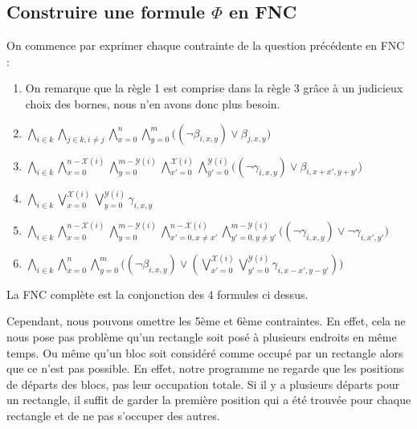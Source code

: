 \documentclass[a4paper]{article}
\begin{document}
\subsection{Construire une formule $\Phi$ en FNC}
On commence par exprimer chaque contrainte de la question précédente en FNC :
\begin{enumerate}
  \item On remarque que la règle 1 est comprise dans la règle 3 grâce à un judicieux choix des bornes, nous n'en avons donc plus besoin.

  \item $
  \bigwedge_{i \in k} \bigwedge_{j \in k, i \neq j} \bigwedge_{x=0}^{n} \bigwedge_{y=0}^{m}
  \Big( (\lnot \beta_{i, x, y}) \lor \beta_{j, x, y} \Big)
  $

  \item $
  \bigwedge_{i \in k}
  \bigwedge_{x=0}^{n - \mathcal{X}(i)} \bigwedge_{y=0}^{m - \mathcal{Y}(i)}
  \bigwedge_{x'=0}^{\mathcal{X}(i)} \bigwedge_{y'=0}^{\mathcal{Y}(i)}
  \Big( (\lnot \gamma_{i, x, y}) \lor \beta_{i, x+x', y+y'} \Big)
  $

  \item $
  \bigwedge_{i \in k} \bigvee_{x=0}^{\mathcal{X}(i)} \bigvee_{y=0}^{\mathcal{Y}(i)} \gamma_{i, x, y}
  $

  \item $
  \bigwedge_{i \in k}
  \bigwedge_{x=0}^{n - \mathcal{X}(i)} \bigwedge_{y=0}^{m - \mathcal{Y}(i)}
  \bigwedge_{x'=0, x\neq x'}^{n - \mathcal{X}(i)} \bigwedge_{y'=0, y\neq y'}^{m - \mathcal{Y}(i)}
  \Big( (\lnot \gamma_{i, x, y}) \lor \lnot \gamma_{i, x', y'} \Big)
  $

  \item $
  \bigwedge_{i \in k} \bigwedge_{x=0}^{n} \bigwedge_{y=0}^{m} \Big(
  ( \lnot \beta_{i, x, y}) \lor
  (\bigvee_{x'=0}^{\mathcal{X}(i)} \bigvee_{y'=0}^{\mathcal{Y}(i)}
  \gamma_{i, x-x', y-y'})
  \Big)
  $


\end{enumerate}
\vspace{1em}

La FNC complète est la conjonction des 4 formules ci dessus.

Cependant, nous pouvons omettre les 5ème et 6ème contraintes. En effet, cela ne nous pose pas problème qu'un rectangle soit posé à plusieurs endroits en même temps. Ou même qu'un bloc soit considéré comme occupé par un rectangle alors que ce n'est pas possible. En effet, notre programme ne regarde que les positions de départs des blocs, pas leur occupation totale. Si il y a plusieurs départs pour un rectangle, il suffit de garder la première position qui a été trouvée pour chaque rectangle et de ne pas s'occuper des autres.
\end{document}
